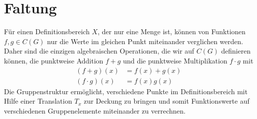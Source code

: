 %
%
%
\section{Faltung
\label{buch:gruppen:section:faltung}}
Für einen Definitionsbereich $X$, der nur eine Menge ist, können
von Funktionen $f,g\in C(G)$ nur die Werte im gleichen Punkt
miteinander verglichen werden. 
Daher sind die einzigen algebraischen Operationen, die wir auf
$C(G)$ definieren können, die punktweise Addition $f+g$ und 
die punktweise Multiplikation $f\cdot g$ mit
\begin{align*}
(f+g)(x)      &= f(x)+g(x) \\
(f\cdot g)(x) &= f(x) g(x)
\end{align*}
Die Gruppenstruktur ermöglicht, verschiedene Punkte im Definitionsbereich
mit Hilfe einer Translation $T_x$ zur Deckung zu bringen und somit
Funktionswerte auf verschiedenen Gruppenelemente miteinander zu verrechnen.

%
% 
